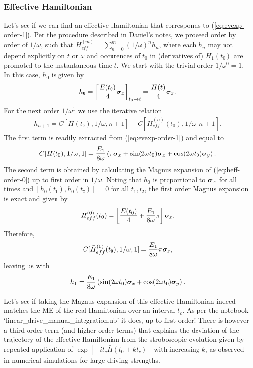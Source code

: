 \subsubsection{Effective Hamiltonian}
Let's see if we can find an effective Hamiltonian that corresponds to (\ref{eq:evexp-order-1}). Per the procedure described in Daniel's notes, we proceed order by order of $1 / \omega$, such that $H_{eff}^{(m)}=\sum_{n=0}^m (1 / \omega)^n h_n$, where each $h_n$ may not depend explicitly on $t$ or $\omega$ and occurences of $t_0$ in (derivatives of) $H_1(t_0)$ are promoted to the instantaneous time $t$. We start with the trivial order $1 / \omega^0 = 1$. In this case, $h_0$ is given by 
\begin{align}
	h_0 = \left[\frac{E(t_0)}{4}\bm{\sigma}_x\right]_{t_0 \to t} = \frac{H(t)}{4}\bm{\sigma}_x. \label{eq:heff-order-0}
\end{align}
For the next order $1 / \omega^1$ we use the iterative relation 
\begin{align}
	h_{n+1} = C[\bar{H}(t_0), 1 / \omega, n+1] - C[\bar{H}_{eff}^{(n)}(t_0),1/\omega,n+1].
\end{align}
The first term is readily extracted from (\ref{eq:evexp-order-1}) and equal to
\begin{align}
	C[\bar{H}(t_0), 1 / \omega, 1] = \frac{E_1}{8 \omega} \left( \pi \bm{\sigma}_x + \sin(2 \omega t_0) \bm{\sigma}_x + \cos(2 \omega t_0) \bm{\sigma}_y \right).
\end{align}
The second term is obtained by calculating the Magnus expansion of (\ref{eq:heff-order-0}) up to first order in $1 / \omega$. Noting that $h_0$ is proportional to $\bm{\sigma}_x$ for all times and $[h_0(t_1),h_0(t_2)] = 0$ for all $t_1, t_2$, the first order Magnus expansion is exact and given by
\begin{align}
	\bar{H}_{eff}^{(0)}(t_0) = \left[ \frac{E(t_0)}{4} + \frac{E_1}{8 \omega} \pi \right] \bm{\sigma}_x.
\end{align}
Therefore,
\begin{align}
	C[\bar{H}_{eff}^{(0)}(t_0),1/\omega,1] = \frac{E_1}{8 \omega} \pi \bm{\sigma}_x,
\end{align}
leaving us with
\begin{align}
	h_1 = \frac{E_1}{8 \omega} \left( \sin(2 \omega t_0) \bm{\sigma}_x + \cos(2 \omega t_0) \bm{\sigma}_y \right).
\end{align}

Let's see if taking the Magnus expansion of this effective Hamiltonian indeed matches the ME of the real Hamiltonian over an interval $t_c$. As per the notebook `linear\_drive\_manual\_integration.nb' it does, up to first order! There is however a third order term (and higher order terms) that explains the deviation of the trajectory of the effective Hamiltonian from the stroboscopic evolution given by repeated application of $\exp[-i t_c \bar{H}(t_0 + k t_c)]$ with increasing $k$, as observed in numerical simulations for large driving strengths.

